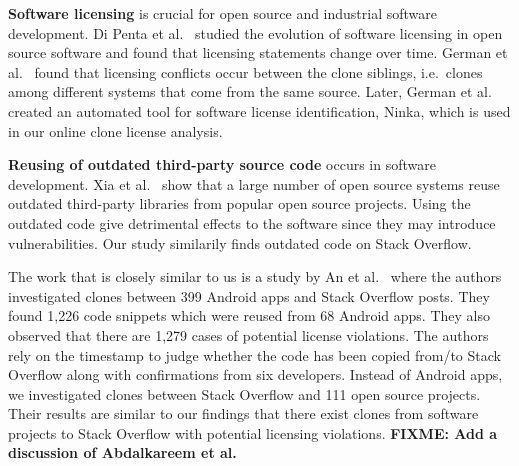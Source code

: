 \documentclass[10pt,journal,compsoc]{IEEEtran}
\newcommand\FIXME[1]{{\color{red}\textbf{FIXME: #1}}}
\begin{document}
\textbf{Software licensing} is crucial for open source and 
industrial software development. Di Penta et al.~\cite{DiPenta2010}
studied the evolution of software licensing in open source 
software and found that licensing statements change over 
time. German et al.~\cite{German2009} found that licensing 
conflicts occur between the clone siblings, i.e.~clones among 
different systems that come from the same source. Later, 
German et al.~\cite{German2010} created an automated tool 
for software license identification, Ninka, which is used
in our online clone license analysis. 

\textbf{Reusing of outdated third-party source code} occurs 
in software development. Xia et al.~\cite{Xia2014} show that 
a large number of open source systems reuse outdated third-party 
libraries from popular open source projects. Using the outdated 
code give detrimental effects to the software since they may 
introduce vulnerabilities. Our study similarily finds
outdated code on Stack Overflow.

The work that is closely similar to us is a study by 
An et al.~\cite{An2017} where the authors investigated 
clones between 399 Android apps and Stack Overflow posts. 
They found 1,226 code snippets which were reused from 68 Android apps. 
They also observed that there are 1,279 cases of potential 
license violations. The authors rely on the timestamp to 
judge whether the code has been copied from/to Stack Overflow 
along with confirmations from six developers. Instead of Android apps, 
we investigated clones between Stack Overflow and 111 open 
source projects. Their results are similar to our findings that 
there exist clones from software projects to Stack Overflow with 
potential licensing violations. 
\FIXME{Add a discussion of Abdalkareem et al.~\cite{Abdalkareem2017}}
\end{document}
